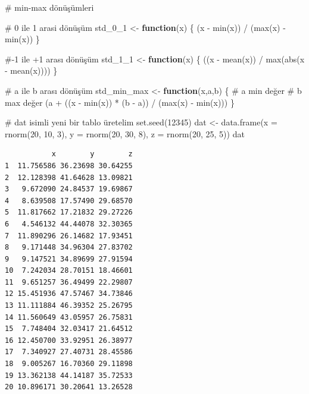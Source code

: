\documentclass[
  letterpaper,
  DIV=11,
  numbers=noendperiod]{scrreprt}
\newenvironment{Shaded}{\begin{snugshade}}{\end{snugshade}}
\newcommand{\AttributeTok}[1]{\textcolor[rgb]{0.40,0.45,0.13}{#1}}
\newcommand{\CommentTok}[1]{\textcolor[rgb]{0.37,0.37,0.37}{#1}}
\newcommand{\ControlFlowTok}[1]{\textcolor[rgb]{0.00,0.23,0.31}{\textbf{#1}}}
\newcommand{\DecValTok}[1]{\textcolor[rgb]{0.68,0.00,0.00}{#1}}
\newcommand{\FunctionTok}[1]{\textcolor[rgb]{0.28,0.35,0.67}{#1}}
\newcommand{\NormalTok}[1]{\textcolor[rgb]{0.00,0.23,0.31}{#1}}
\newcommand{\OtherTok}[1]{\textcolor[rgb]{0.00,0.23,0.31}{#1}}
\newcommand{\SpecialCharTok}[1]{\textcolor[rgb]{0.37,0.37,0.37}{#1}}
\begin{document}
\begin{Shaded}
\begin{Highlighting}[]
\CommentTok{\# min{-}max dönüşümleri}

\CommentTok{\# 0 ile 1 arasi dönüşüm}
\NormalTok{std\_0\_1 }\OtherTok{\textless{}{-}} \ControlFlowTok{function}\NormalTok{(x) \{}
\NormalTok{  (x }\SpecialCharTok{{-}} \FunctionTok{min}\NormalTok{(x)) }\SpecialCharTok{/}\NormalTok{ (}\FunctionTok{max}\NormalTok{(x) }\SpecialCharTok{{-}} \FunctionTok{min}\NormalTok{(x))}
\NormalTok{\}}

\CommentTok{\#{-}1 ile +1 arası dönüşüm }
\NormalTok{std\_1\_1 }\OtherTok{\textless{}{-}} \ControlFlowTok{function}\NormalTok{(x) \{}
\NormalTok{  ((x }\SpecialCharTok{{-}} \FunctionTok{mean}\NormalTok{(x)) }\SpecialCharTok{/} \FunctionTok{max}\NormalTok{(}\FunctionTok{abs}\NormalTok{(x }\SpecialCharTok{{-}} \FunctionTok{mean}\NormalTok{(x))))}
\NormalTok{\}}

\CommentTok{\# a ile b arası dönüşüm }
\NormalTok{std\_min\_max }\OtherTok{\textless{}{-}} \ControlFlowTok{function}\NormalTok{(x,a,b) \{}
  \CommentTok{\# a min değer}
  \CommentTok{\# b max değer}
\NormalTok{  (a }\SpecialCharTok{+}\NormalTok{ ((x }\SpecialCharTok{{-}} \FunctionTok{min}\NormalTok{(x)) }\SpecialCharTok{*}\NormalTok{ (b }\SpecialCharTok{{-}}\NormalTok{ a)) }\SpecialCharTok{/}\NormalTok{ (}\FunctionTok{max}\NormalTok{(x) }\SpecialCharTok{{-}} \FunctionTok{min}\NormalTok{(x)))}
\NormalTok{\}}

\CommentTok{\# dat isimli yeni bir tablo üretelim}
\FunctionTok{set.seed}\NormalTok{(}\DecValTok{12345}\NormalTok{)}
\NormalTok{dat }\OtherTok{\textless{}{-}} \FunctionTok{data.frame}\NormalTok{(}\AttributeTok{x =} \FunctionTok{rnorm}\NormalTok{(}\DecValTok{20}\NormalTok{, }\DecValTok{10}\NormalTok{, }\DecValTok{3}\NormalTok{),}
                  \AttributeTok{y =} \FunctionTok{rnorm}\NormalTok{(}\DecValTok{20}\NormalTok{, }\DecValTok{30}\NormalTok{, }\DecValTok{8}\NormalTok{),}
                  \AttributeTok{z =} \FunctionTok{rnorm}\NormalTok{(}\DecValTok{20}\NormalTok{, }\DecValTok{25}\NormalTok{, }\DecValTok{5}\NormalTok{))}
\NormalTok{dat}
\end{Highlighting}
\end{Shaded}

\begin{verbatim}
           x        y        z
1  11.756586 36.23698 30.64255
2  12.128398 41.64628 13.09821
3   9.672090 24.84537 19.69867
4   8.639508 17.57490 29.68570
5  11.817662 17.21832 29.27226
6   4.546132 44.44078 32.30365
7  11.890296 26.14682 17.93451
8   9.171448 34.96304 27.83702
9   9.147521 34.89699 27.91594
10  7.242034 28.70151 18.46601
11  9.651257 36.49499 22.29807
12 15.451936 47.57467 34.73846
13 11.111884 46.39352 25.26795
14 11.560649 43.05957 26.75831
15  7.748404 32.03417 21.64512
16 12.450700 33.92951 26.38977
17  7.340927 27.40731 28.45586
18  9.005267 16.70360 29.11898
19 13.362138 44.14187 35.72533
20 10.896171 30.20641 13.26528
\end{verbatim}
\end{document}
